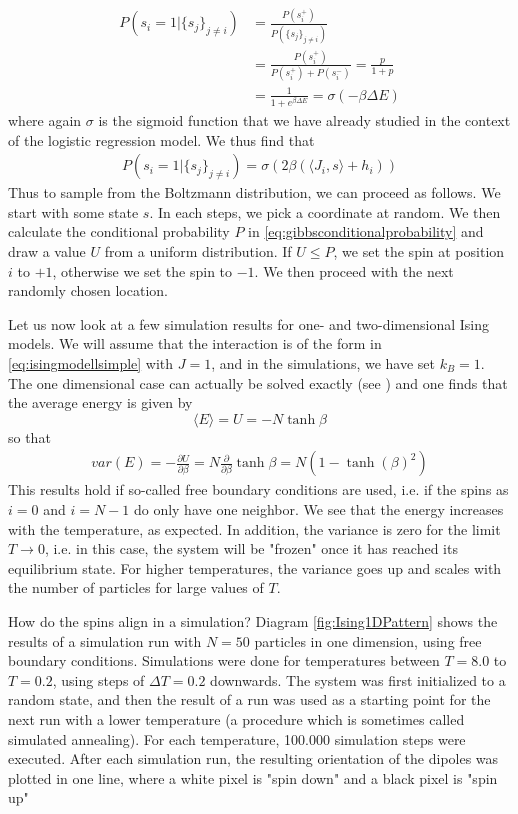 \documentclass[a4paper, draft]{article}
\theoremstyle{own}
\theoremstyle{remark}
\begin{document}
\begin{align*}
P(s_i = 1 | \{ s_j\}_{j \neq i}) & = \frac{P(s_i^+)}{P(\{ s_j\}_{j \neq i})} \\
&= \frac{P(s_i^+)}{P(s_i^+) + P(s_i^-)} = \frac{p}{1 + p} \\
&= \frac{1}{1 + e^{\beta \Delta E}} = \sigma(-\beta \Delta E)
\end{align*}
where again $\sigma$ is the sigmoid function that we have already studied in the context of the logistic regression model. We thus find that
\begin{align}\label{eq:gibbsconditionalprobability}
P(s_i = 1 | \{ s_j\}_{j \neq i}) = \sigma(2 \beta ( \langle J_i, s \rangle + h_i))
\end{align}
Thus to sample from the Boltzmann distribution, we can proceed as follows. We start with some state $s$. In each steps, we pick a coordinate at random. We then calculate the conditional probability $P$ in \eqref{eq:gibbsconditionalprobability} and draw a value $U$ from a uniform distribution. If $U \leq P$, we set the spin at position $i$ to $+1$, otherwise we set the spin to $-1$. We then proceed with the next randomly chosen location.

Let us now look at a few simulation results for one- and two-dimensional Ising models. We will assume that the interaction is of the form in \eqref{eq:isingmodellsimple} with $J = 1$, and in the simulations, we have set $k_B = 1$. The one dimensional case can actually be solved exactly (see \cite{Schroeder}) and one finds that the average energy is given by
$$
\langle E \rangle = U = -N \tanh \beta
$$
so that
\begin{align*}
var(E) = - \frac{\partial U}{\partial \beta}  
= N \frac{\partial }{\partial \beta} \tanh \beta 
= N (1 - \tanh(\beta)^2)
\end{align*}
This results hold if so-called free boundary conditions are used, i.e. if the spins as $i=0$ and $i=N-1$ do only have one neighbor. 
We see that the energy increases with the temperature, as expected. In addition, the variance is zero for the limit $T \rightarrow 0$, i.e. in this case, the system will be "frozen" once it has reached its equilibrium state. For higher temperatures, the variance goes up and scales with the number of particles for large values of $T$. 

How do the spins align in a simulation? Diagram \ref{fig:Ising1DPattern} shows the results of a simulation run with $N = 50$ particles in one dimension, using free boundary conditions. Simulations were done for temperatures between $T = 8.0$ to $T = 0.2$, using steps of $\Delta T = 0.2$ downwards. The system was first initialized to a random state, and then the result of a run was used as a starting point for the next run with a lower temperature (a procedure which is sometimes called simulated annealing). For each temperature, 100.000 simulation steps were executed. After each simulation run, the resulting orientation of the dipoles was plotted in one line, where a white pixel is "spin down" and a black pixel is "spin up"
\end{document}
